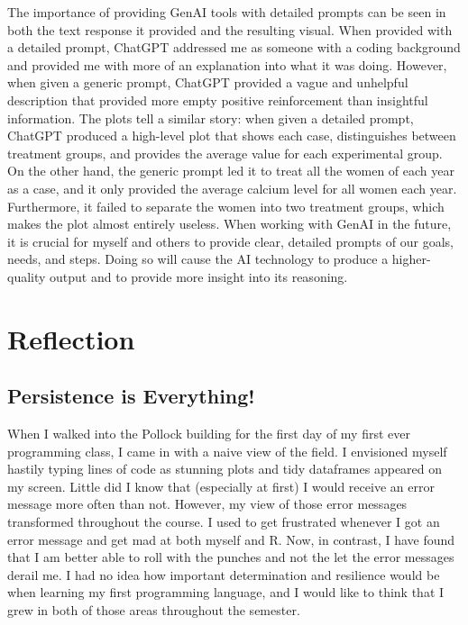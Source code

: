 \documentclass[
  letterpaper,
  DIV=11,
  numbers=noendperiod]{scrartcl}
\begin{document}
The importance of providing GenAI tools with detailed prompts can be
seen in both the text response it provided and the resulting visual.
When provided with a detailed prompt, ChatGPT addressed me as someone
with a coding background and provided me with more of an explanation
into what it was doing. However, when given a generic prompt, ChatGPT
provided a vague and unhelpful description that provided more empty
positive reinforcement than insightful information. The plots tell a
similar story: when given a detailed prompt, ChatGPT produced a
high-level plot that shows each case, distinguishes between treatment
groups, and provides the average value for each experimental group. On
the other hand, the generic prompt led it to treat all the women of each
year as a case, and it only provided the average calcium level for all
women each year. Furthermore, it failed to separate the women into two
treatment groups, which makes the plot almost entirely useless. When
working with GenAI in the future, it is crucial for myself and others to
provide clear, detailed prompts of our goals, needs, and steps. Doing so
will cause the AI technology to produce a higher-quality output and to
provide more insight into its reasoning.

\section{Reflection}\label{reflection}

\subsection{Persistence is Everything!}\label{persistence-is-everything}

When I walked into the Pollock building for the first day of my first
ever programming class, I came in with a naive view of the field. I
envisioned myself hastily typing lines of code as stunning plots and
tidy dataframes appeared on my screen. Little did I know that
(especially at first) I would receive an error message more often than
not. However, my view of those error messages transformed throughout the
course. I used to get frustrated whenever I got an error message and get
mad at both myself and R. Now, in contrast, I have found that I am
better able to roll with the punches and not the let the error messages
derail me. I had no idea how important determination and resilience
would be when learning my first programming language, and I would like
to think that I grew in both of those areas throughout the semester.
\end{document}
